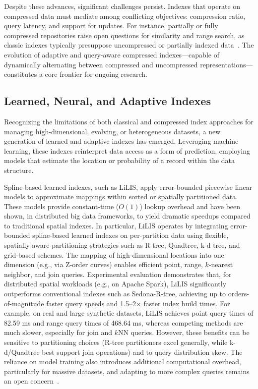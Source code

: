 \documentclass[sigconf]{acmart}
\begin{document}
Despite these advances, significant challenges persist. Indexes that operate on compressed data must mediate among conflicting objectives: compression ratio, query latency, and support for updates. For instance, partially or fully compressed repositories raise open questions for similarity and range search, as classic indexes typically presuppose uncompressed or partially indexed data~\cite{ref118}. The evolution of adaptive and query-aware compressed indexes—capable of dynamically alternating between compressed and uncompressed representations—constitutes a core frontier for ongoing research.

\subsection{Learned, Neural, and Adaptive Indexes}

Recognizing the limitations of both classical and compressed index approaches for managing high-dimensional, evolving, or heterogeneous datasets, a new generation of learned and adaptive indexes has emerged. Leveraging machine learning, these indexes reinterpret data access as a form of prediction, employing models that estimate the location or probability of a record within the data structure.

Spline-based learned indexes, such as LiLIS, apply error-bounded piecewise linear models to approximate mappings within sorted or spatially partitioned data. These models provide constant-time ($O(1)$) lookup overhead and have been shown, in distributed big data frameworks, to yield dramatic speedups compared to traditional spatial indexes. In particular, LiLIS operates by integrating error-bounded spline-based learned indexes on per-partition data using flexible, spatially-aware partitioning strategies such as R-tree, Quadtree, k-d tree, and grid-based schemes. The mapping of high-dimensional locations into one dimension (e.g., via Z-order curves) enables efficient point, range, $k$-nearest neighbor, and join queries. Experimental evaluation demonstrates that, for distributed spatial workloads (e.g., on Apache Spark), LiLIS significantly outperforms conventional indexes such as Sedona-R-tree, achieving up to orders-of-magnitude faster query speeds and 1.5--2$\times$ faster index build times. For example, on real and large synthetic datasets, LiLIS achieves point query times of 82.59 ms and range query times of 468.64 ms, whereas competing methods are much slower, especially for join and $k$NN queries. However, these benefits can be sensitive to partitioning choices (R-tree partitioners excel generally, while k-d/Quadtree best support join operations) and to query distribution skew. The reliance on model training also introduces additional computational overhead, particularly for massive datasets, and adapting to more complex queries remains an open concern~\cite{ref110,ref111}.
\end{document}
